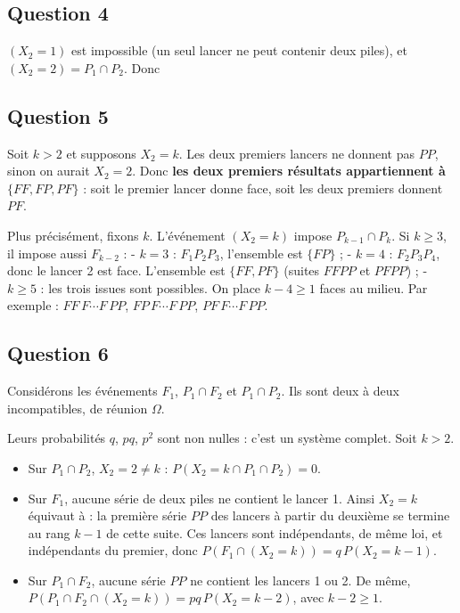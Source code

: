 \documentclass[11pt,a4paper]{article}
\providecommand{\tightlist}{\setlength{\itemsep}{0pt}\setlength{\parskip}{0pt}}
\newcommand{\equationajustee}[1]{%
  \sbox{\boiteequation}{$\displaystyle #1$}%
  \ifdim\wd\boiteequation>\linewidth
    \[\resizebox{\linewidth}{!}{\usebox{\boiteequation}}\]%
  \else
    \[#1\]%
  \fi}
\begin{document}
\hypertarget{question-4}{%
\subsection{Question 4}\label{question-4}}

\((X_2=1)\) est impossible (un seul lancer ne peut contenir deux piles), et \((X_2=2)=P_1\cap P_2\). Donc
\equationajustee{\boxed{\begin{aligned}
P(X_2=1)&=0,\\
P(X_2=2)&=p^2.
\end{aligned}}}

\hypertarget{question-5}{%
\subsection{Question 5}\label{question-5}}

Soit \(k>2\) et supposons \(X_2=k\). Les deux premiers lancers ne donnent pas \(PP\), sinon on aurait \(X_2=2\). Donc \textbf{les deux premiers résultats appartiennent à \(\{FF,FP,PF\}\)} : soit le premier lancer donne face, soit les deux premiers donnent \(PF\).

Plus précisément, fixons \(k\). L'événement \((X_2=k)\) impose \(P_{k-1}\cap P_k\). Si \(k\geqslant3\), il impose aussi \(F_{k-2}\) :
- \(k=3\) : \(F_1P_2P_3\), l'ensemble est \(\{FP\}\) ;
- \(k=4\) : \(F_2P_3P_4\), donc le lancer 2 est face. L'ensemble est \(\{FF,PF\}\) (suites \(FFPP\) et \(PFPP\)) ;
- \(k\geqslant5\) : les trois issues sont possibles. On place \(k-4\geqslant1\) faces au milieu. Par exemple : \(FF\,F\cdots F\,PP\), \(FP\,F\cdots F\,PP\), \(PF\,F\cdots F\,PP\).

\hypertarget{question-6}{%
\subsection{Question 6}\label{question-6}}

Considérons les événements \(F_1\), \(P_1\cap F_2\) et \(P_1\cap P_2\). Ils sont deux à deux incompatibles, de réunion \(\Omega\).

Leurs probabilités \(q\), \(pq\), \(p^2\) sont non nulles : c'est un système complet. Soit \(k>2\).

\begin{itemize}
\tightlist
\item
  Sur \(P_1\cap P_2\), \(X_2=2\neq k\) : \(P(X_2=k\cap P_1\cap P_2)=0\).
\item
  Sur \(F_1\), aucune série de deux piles ne contient le lancer 1. Ainsi \(X_2=k\) équivaut à : la première série \(PP\) des lancers à partir du deuxième se termine au rang \(k-1\) de cette suite. Ces lancers sont indépendants, de même loi, et indépendants du premier, donc \(P(F_1\cap(X_2=k))=q\,P(X_2=k-1)\).
\item
  Sur \(P_1\cap F_2\), aucune série \(PP\) ne contient les lancers 1 ou 2. De même, \(P(P_1\cap F_2\cap(X_2=k))=pq\,P(X_2=k-2)\), avec \(k-2\geqslant1\).
\end{itemize}
\end{document}
